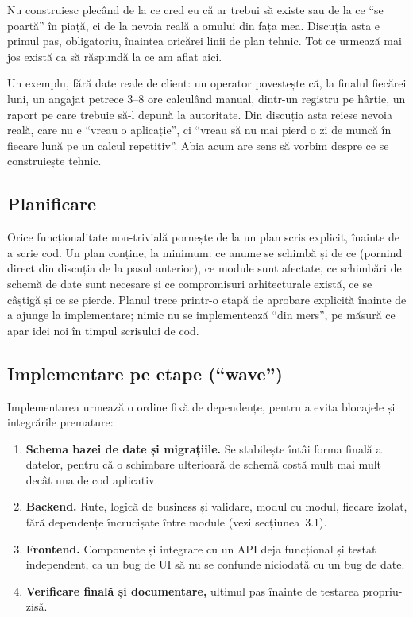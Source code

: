 \documentclass[11pt, a4paper]{article}
\begin{document}
Nu construiesc plecând de la ce cred eu că ar trebui să existe sau de la ce ``se poartă'' în
piață, ci de la nevoia reală a omului din fața mea. Discuția asta e primul pas, obligatoriu,
înaintea oricărei linii de plan tehnic. Tot ce urmează mai jos există ca să răspundă la ce am
aflat aici.

Un exemplu, fără date reale de client: un operator povestește că, la finalul fiecărei luni, un
angajat petrece 3--8 ore calculând manual, dintr-un registru pe hârtie, un raport pe care trebuie
să-l depună la autoritate. Din discuția asta reiese nevoia reală, care nu e ``vreau o aplicație'',
ci ``vreau să nu mai pierd o zi de muncă în fiecare lună pe un calcul repetitiv''. Abia acum are
sens să vorbim despre ce se construiește tehnic.

\subsection{Planificare}

Orice funcționalitate non-trivială pornește de la un plan scris explicit, înainte de a scrie
cod. Un plan conține, la minimum: ce anume se schimbă și de ce (pornind direct din discuția de
la pasul anterior), ce module sunt afectate, ce schimbări de schemă de date sunt necesare și ce
compromisuri arhitecturale există, ce se câștigă și ce se pierde. Planul trece printr-o etapă de
aprobare explicită înainte de a ajunge la implementare; nimic nu se implementează ``din mers'',
pe măsură ce apar idei noi în timpul scrisului de cod.

\subsection{Implementare pe etape (``wave'')}

Implementarea urmează o ordine fixă de dependențe, pentru a evita blocajele și integrările
premature:
\begin{enumerate}[leftmargin=2em, itemsep=0.3em]
  \item \textbf{Schema bazei de date și migrațiile.} Se stabilește întâi forma finală a datelor,
  pentru că o schimbare ulterioară de schemă costă mult mai mult decât una de cod aplicativ.
  \item \textbf{Backend.} Rute, logică de business și validare, modul cu modul, fiecare izolat,
  fără dependențe încrucișate între module (vezi secțiunea~3.1).
  \item \textbf{Frontend.} Componente și integrare cu un API deja funcțional și testat
  independent, ca un bug de UI să nu se confunde niciodată cu un bug de date.
  \item \textbf{Verificare finală și documentare,} ultimul pas înainte de testarea propriu-zisă.
\end{enumerate}
\end{document}
